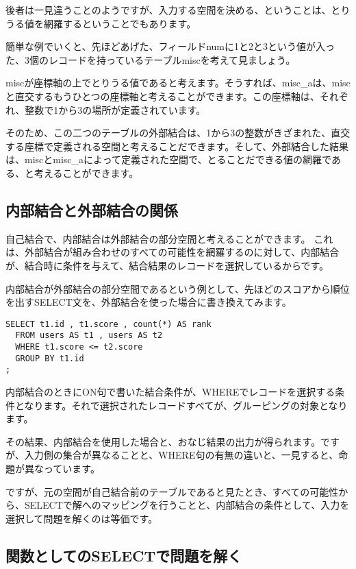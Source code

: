 後者は一見違うことのようですが、入力する空間を決める、ということは、とりうる値を網羅するということでもあります。

簡単な例でいくと、先ほどあげた、フィールドnumに1と2と3という値が入った、3個のレコードを持っているテーブルmiscを考えて見ましょう。

miscが座標軸の上でとりうる値であると考えます。そうすれば、misc\_aは、miscと直交するもうひとつの座標軸と考えることができます。この座標軸は、それぞれ、整数で1から3の場所が定義されています。

そのため、この二つのテーブルの外部結合は、1から3の整数がきざまれた、直交する座標で定義される空間と考えることだできます。そして、外部結合した結果は、miscとmisc\_aによって定義された空間で、とることだできる値の網羅である、と考えることができます。

\subsection{内部結合と外部結合の関係}

自己結合で、内部結合は外部結合の部分空間と考えることができます。
これは、外部結合が組み合わせのすべての可能性を網羅するのに対して、内部結合が、結合時に条件を与えて、結合結果のレコードを選択しているからです。

内部結合が外部結合の部分空間であるという例として、先ほどのスコアから順位を出すSELECT文を、外部結合を使った場合に書き換えてみます。

\begin{verbatim}
SELECT t1.id , t1.score , count(*) AS rank
  FROM users AS t1 , users AS t2
  WHERE t1.score <= t2.score
  GROUP BY t1.id
;
\end{verbatim}

内部結合のときにON句で書いた結合条件が、WHEREでレコードを選択する条件となります。それで選択されたレコードすべてが、グルーピングの対象となります。

その結果、内部結合を使用した場合と、おなじ結果の出力が得られます。ですが、入力側の集合が異なることと、WHERE句の有無の違いと、一見すると、命題が異なっています。

ですが、元の空間が自己結合前のテーブルであると見たとき、すべての可能性から、SELECTで解へのマッピングを行うことと、内部結合の条件として、入力を選択して問題を解くのは等価です。

\subsection{関数としてのSELECTで問題を解く}

